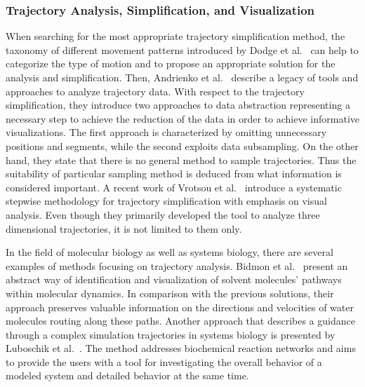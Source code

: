 \documentclass[twocolumn]{bmcart}%
\begin{document}
\subsubsection*{Trajectory Analysis, Simplification, and Visualization}
When searching for the most appropriate trajectory simplification method, the taxonomy of different movement patterns introduced by Dodge et al.~\cite{Dodge2008} can help to categorize the type of motion and to propose an appropriate solution for the analysis and simplification.
Then, Andrienko et al.~\cite{andrienko2013} describe a legacy of tools and approaches to analyze trajectory data.
With respect to the trajectory simplification, they introduce two approaches to data abstraction representing a necessary step to achieve the reduction of the data in order to achieve informative visualizations.
The first approach is characterized by omitting unnecessary positions and segments, while the second exploits data subsampling.
On the other hand, they state that there is no general method to sample trajectories.
Thus the suitability of particular sampling method is deduced from what information is considered important.
A recent work of Vrotsou et al.~\cite{Vrotsou2015} introduce a systematic stepwise methodology for trajectory simplification with emphasis on visual analysis.
Even though they primarily developed the tool to analyze three dimensional trajectories, it is not limited to them only.

In the field of molecular biology as well as systems biology, there are several examples of methods focusing on trajectory analysis.
Bidmon et al.~\cite{bidmon2008} present an abstract way of identification and visualization of solvent molecules' pathways within molecular dynamics. 
In comparison with the previous solutions, their approach preserves valuable information on the directions and velocities of water molecules routing along these paths. 
Another approach that describes a guidance through a complex simulation trajectories in systems biology is presented by Luboschik et al.~\cite{Luboschik2012}. 
The method addresses biochemical reaction networks and aims to provide the users with a tool for investigating the overall behavior of a modeled system and detailed behavior at the same time.
\end{document}
